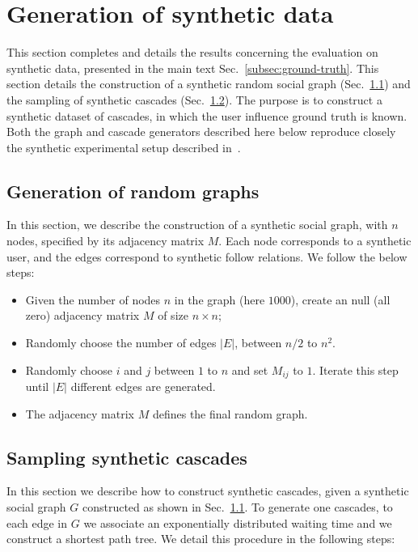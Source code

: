 \section{Generation of synthetic data}
\label{si-sec:generation-artificial}

This section completes and details the results concerning the evaluation on synthetic data, presented in the main text Sec.~\ref{subsec:ground-truth}.
This section details the construction of a synthetic random social graph (Sec.~\ref{si-subsec:random-graph}) and the sampling of synthetic cascades (Sec.~\ref{si-subsec:random-sampling}).
The purpose is to construct a synthetic dataset of cascades, in which the user influence ground truth is known.
Both the graph and cascade generators described here below reproduce closely the synthetic experimental setup described in~\cite{Du2013}.

\subsection{Generation of random graphs}
\label{si-subsec:random-graph}

In this section, we describe the construction of a synthetic social graph, with $n$ nodes, specified by its adjacency matrix $M$.
Each node corresponds to a synthetic user, and the edges correspond to synthetic follow relations.
We follow the below steps:
\begin{itemize}
	\item Given the number of nodes $n$ in the graph (here $1000$), create an null (all zero) adjacency matrix $M$ of size $n \times n$;
	\item Randomly choose the number of edges $|E|$, between $n/2$ to $n^2$.
	\item Randomly choose $i$ and $j$ between $1$ to $n$ and set $M_{ij}$ to $1$. Iterate this step until $|E|$ different edges are generated.
	\item The adjacency matrix $M$ defines the final random graph.
\end{itemize}

\subsection{Sampling synthetic cascades}
\label{si-subsec:random-sampling}

In this section we describe how to construct synthetic cascades, given a synthetic social graph $G$ constructed as shown in Sec.~\ref{si-subsec:random-graph}.
To generate one cascades, to each edge in $G$ we associate an exponentially distributed waiting time and we construct a shortest path tree.
We detail this procedure in the following steps:

